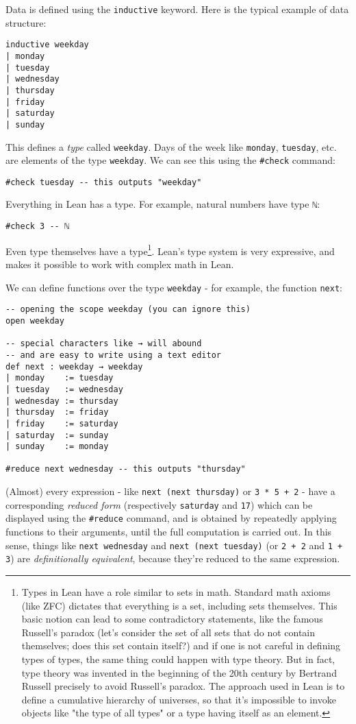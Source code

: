 \documentclass{book}
\theoremstyle{definition}
\theoremstyle{remark}
\theoremstyle{plain}
\begin{document}
Data is defined using the \lstinline{inductive} keyword.
Here is the typical example of data structure:
\begin{lstlisting}
inductive weekday
| monday
| tuesday
| wednesday
| thursday
| friday
| saturday
| sunday
\end{lstlisting}
This defines a \textit{type} called \lstinline{weekday}.
Days of the week like \lstinline{monday}, \lstinline{tuesday}, etc. are elements of the type \lstinline{weekday}.
We can see this using the \lstinline{#check} command:
\begin{lstlisting}
#check tuesday -- this outputs "weekday"
\end{lstlisting}
Everything in Lean has a type. For example, natural numbers have type \lstinline{ℕ}:
\begin{lstlisting}
#check 3 -- ℕ
\end{lstlisting}
Even type themselves have a type\footnote{Types in Lean have a role similar to sets in math.
Standard math axioms (like ZFC) dictates that everything is a set, including sets themselves.
This basic notion can lead to some contradictory statements, like the famous Russell's paradox
(let's consider the set of all sets that do not contain themselves; does this set contain itself?)
and if one is not careful in defining types of types, the same thing could happen with type theory.
But in fact, type theory was invented in the beginning of the 20th century by Bertrand Russell precisely to avoid Russell's paradox.
The approach used in Lean is to define a cumulative hierarchy of universes,
so that it's impossible to invoke objects like "the type of all types" or a type having itself as an element.}.
Lean's type system is very expressive, and makes it possible to work with complex math in Lean.

We can define functions over the type \lstinline{weekday} -
for example, the function \lstinline{next}:

\begin{lstlisting}
-- opening the scope weekday (you can ignore this)
open weekday

-- special characters like → will abound
-- and are easy to write using a text editor
def next : weekday → weekday
| monday    := tuesday
| tuesday   := wednesday
| wednesday := thursday
| thursday  := friday
| friday    := saturday
| saturday  := sunday
| sunday    := monday

#reduce next wednesday -- this outputs "thursday"
\end{lstlisting}

(Almost) every expression - like \lstinline{next (next thursday)} or \lstinline{3 * 5 + 2} -
have a corresponding \textit{reduced form} (respectively \lstinline{saturday} and \lstinline{17})
which can be displayed using the \lstinline{#reduce} command,
and is obtained by repeatedly applying functions to their arguments, until the full computation is carried out.
In this sense, things like \lstinline{next wednesday} and \lstinline{next (next tuesday)}
(or \lstinline{2 + 2} and \lstinline{1 + 3}) are \textit{definitionally equivalent}, because they're reduced to the same expression.
\end{document}
